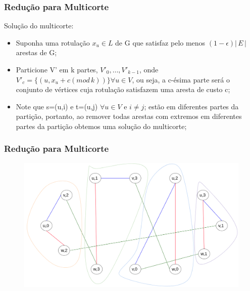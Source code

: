 \documentclass[11pt, handout]{beamer}
\begin{document}
\begin{frame}[<+->]
    \frametitle{Redução para Multicorte}
        Solução do multicorte:
        \begin{itemize}
            \item Suponha uma rotulação $x_u \in L$ de G que satisfaz pelo menos $(1-\epsilon)|\,E\,|$ arestas de G;
            \item Particione V' em k partes, $V'_0,\dots,V'_{k-1}$, onde $V'_c=\{(u,x_u+c(mod\,k))\} \forall u \in V$, ou seja, a c-ésima parte será o conjunto de vértices cuja rotulação satisfazem uma aresta de custo c;          \item Note que s=(u,i) e t=(u,j) $\forall u\in V$ e $i \ne j$; estão em diferentes partes da partição, portanto, ao remover todas arestas com extremos em diferentes partes da partição obtemos uma solução do multicorte;
        \end{itemize}
\end{frame}{}

\begin{frame}
    \frametitle{Redução para Multicorte}
    
    \begin{figure}
        \centering
        \includegraphics[width=1\textwidth]{images/Partition.png}
    \end{figure}{}
    
\end{frame}
\end{document}
